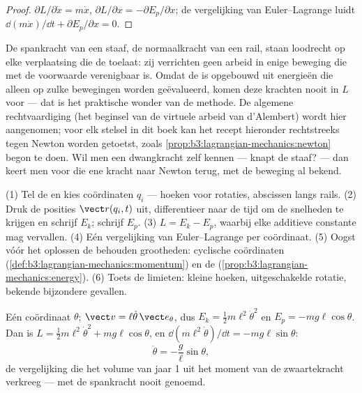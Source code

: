 \begin{proof}
$\partial L/\partial\dot x = m\dot x$, $\partial L/\partial x =
-\partial E_p/\partial x$; de vergelijking van Euler--Lagrange luidt
$\dd(m\dot x)/\dd t + \partial E_p/\partial x = 0$.
\end{proof}

\begin{remark}\label{rem:b3:lagrangian-mechanics:constraints}
De spankracht van een staaf, de normaalkracht van een rail, staan loodrecht
op elke verplaatsing die de  toelaat: zij verrichten geen
arbeid in enige beweging die met de voorwaarde verenigbaar is. Omdat de
 is opgebouwd uit energieën die alleen op zulke bewegingen worden
geëvalueerd, komen deze krachten nooit in $L$ voor --- dat is het
praktische wonder van de methode. De algemene rechtvaardiging (het
beginsel van de virtuele arbeid van d'Alembert) wordt hier aangenomen;
voor elk stelsel in dit boek kan het recept hieronder rechtstreeks tegen
Newton worden getoetst, zoals \cref{prop:b3:lagrangian-mechanics:newton}
begon te doen. Wil men een dwangkracht zelf kennen --- knapt de staaf? ---
dan keert men voor die ene kracht naar Newton terug, met de beweging al
bekend.
\end{remark}

\begin{method}\label{met:b3:lagrangian-mechanics:recipe}
(1) Tel de  en kies coördinaten $q_i$ --- hoeken voor
rotaties, abscissen langs rails. (2) Druk de posities $\vect r(q_i, t)$
uit, differentieer naar de tijd om de snelheden te krijgen en schrijf
$E_k$; schrijf $E_p$. (3) $L = E_k - E_p$, waarbij elke additieve
constante mag vervallen. (4) Eén vergelijking van Euler--Lagrange per
coördinaat. (5) Oogst vóór het oplossen de behouden grootheden: cyclische
coördinaten (\cref{def:b3:lagrangian-mechanics:momentum}) en de
 (\cref{prop:b3:lagrangian-mechanics:energy}). (6) Toets de
limieten: kleine hoeken, uitgeschakelde rotatie, bekende bijzondere
gevallen.
\end{method}

\begin{example}\label{ex:b3:lagrangian-mechanics:pendulum}
Eén coördinaat $\theta$; $\vect v = \ell\dot\theta\,\vect e_\theta$, dus
$E_k = \tfrac12 m\ell^2\dot\theta^2$ en $E_p = -mg\ell\cos\theta$. Dan is
$L = \tfrac12 m\ell^2\dot\theta^2 + mg\ell\cos\theta$, en
$\dd(m\ell^2\dot\theta)/\dd t = -mg\ell\sin\theta$:
\[
\ddot\theta = -\frac{g}{\ell}\sin\theta ,
\]
de vergelijking die het volume van jaar 1 uit het moment van de
zwaartekracht verkreeg --- met de spankracht nooit genoemd.
\end{example}

